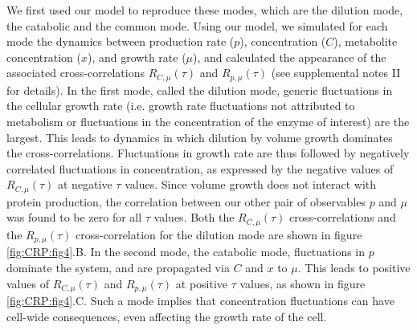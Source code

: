 %
We first used our model to reproduce these modes,
which are the dilution mode, the catabolic  and the common mode.
%
Using our model, we simulated for each mode the dynamics between production rate ($p$), concentration ($C$), metabolite concentration ($x$), and growth rate ($\mu$),
and calculated the appearance of the associated cross-correlations %
$R_{C,\mu}(\tau)$ and $R_{p,\mu}(\tau)$ (see supplemental notes II for details). %
%
In the first mode, called the dilution mode, 
generic fluctuations in the cellular growth rate 
(i.e. growth rate fluctuations not attributed to metabolism or fluctuations in the concentration of the enzyme of interest) are the largest. 
This  leads to dynamics in which dilution by volume growth dominates the cross-correlations.
Fluctuations in growth rate are thus followed by negatively correlated fluctuations in concentration, as expressed by the negative values of $R_{C,\mu}(\tau)$ at negative $\tau$ values.
Since volume growth does not interact with protein production, the correlation between our other pair of observables $p$ and $\mu$ was found to be zero for all $\tau$ values.
Both the $R_{C,\mu}(\tau)$ cross-correlations and the $R_{p,\mu}(\tau)$ cross-correlation for the dilution mode are shown in figure \ref{fig:CRP:fig4}.B.
%
In the second mode, the catabolic mode,
fluctuations in $p$ dominate the system, and are propagated via $C$ and $x$ to $\mu$.
This leads to  positive values of $R_{C,\mu}(\tau)$ and $R_{p,\mu}(\tau)$ at positive $\tau$ values, 
as shown in figure \ref{fig:CRP:fig4}.C.
Such a mode implies that concentration fluctuations can have cell-wide consequences, even affecting the growth rate of the cell.
